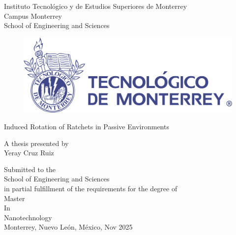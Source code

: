 \thispagestyle{empty} %

\begin{center}
\large { Instituto Tecnológico y de Estudios Superiores de Monterrey\\}
\vspace*{0.5em}
\normalsize { Campus Monterrey } \\
\vspace*{0.5em}
\large{School of Engineering and Sciences\\}
\vspace*{1em}

\begin{figure}[!h]
 \begin{center}
  \includegraphics[scale=0.1]{pics/LogoTec.pdf}
 \end{center}
\end{figure}
\vspace*{0.6cm}

\Large {Induced Rotation of Ratchets in Passive Environments}

\vspace*{0.5em}
\normalsize{A thesis presented by}\\
\vspace*{0.5em}
\large{Yeray Cruz Ruiz}\\
\vspace*{1.5cm}
\normalsize

Submitted to the\\
School of Engineering and Sciences\\
in partial fulfillment of the requirements for the degree of\\
\vspace*{1em}
\large{Master} \\
\large{In} \\
\large{Nanotechnology} \\
\normalsize
\vfill
Monterrey, Nuevo León, México, Nov 2025\\
\end{center}


